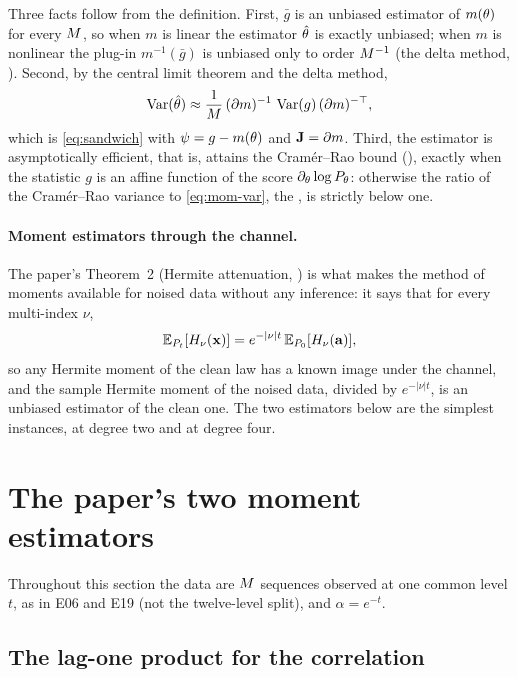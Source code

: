 Three facts follow from the definition. First, $\bar g$ is an unbiased estimator of
$m(\theta)$ for every $M$, so when $m$ is linear the estimator $\hat{\theta}$ is
exactly unbiased; when $m$ is nonlinear the plug-in $m^{-1}(\bar g)$ is unbiased only to
order $M^{-1}$ (the delta method, ). Second, by
the central limit theorem and the delta method,
\begin{equation}
  \operatorname{Var}(\hat{\theta})\approx\frac{1}{M}\,(\partial m)^{-1}\,\operatorname{Var}(g)\,(\partial m)^{-\top},
  \label{eq:mom-var}
\end{equation}
which is \cref{eq:sandwich} with $\psi=g-m(\theta)$ and $\mathbf{J}=\partial m$. Third,
the estimator is asymptotically efficient, that is, attains the Cram\'er--Rao bound
(), exactly when the statistic $g$ is an affine function of
the score $\partial_\theta\log P_\theta$: otherwise the ratio of the Cram\'er--Rao
variance to \cref{eq:mom-var}, the , is strictly
below one.

\paragraph{Moment estimators through the channel.}
The paper's Theorem~2 (Hermite attenuation, ) is what
makes the method of moments available for noised data without any inference: it says
that for every multi-index $\nu$,
\begin{equation}
  \mathbb{E}_{P_t}[H_\nu(\mathbf{x})]=e^{-|\nu|t}\,\mathbb{E}_{P_0}[H_\nu(\mathbf{a})],
\end{equation}
so any Hermite moment of the clean law has a known image under the channel, and the
sample Hermite moment of the noised data, divided by $e^{-|\nu|t}$, is an unbiased
estimator of the clean one. The two estimators below are the simplest instances, at
degree two and at degree four.

\section{The paper's two moment estimators}
\label{sec:two-estimators}

Throughout this section the data are $M$ sequences observed at one common level
$t$, as in E06 and E19 (not the twelve-level split), and $\alpha=e^{-t}$.

\subsection{The lag-one product for the correlation}

